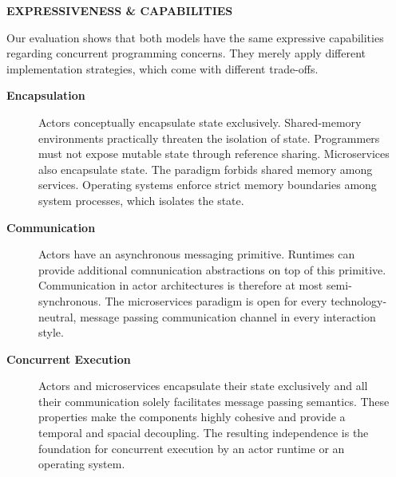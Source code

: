 \documentclass[final,hyperref={pdfpagelabels=true}]{beamer}
\begin{document}
\begin{frame}
  \begin{columns}[t]
    \begin{column}{.03\textwidth}
      \end{column}
    \begin{column}{.44\textwidth}
      \textsf{\textbf{EXPRESSIVENESS \& CAPABILITIES}} \\
      \vspace*{\baselineskip}
      {\lmodern
        \begin{justify}
        Our evaluation shows that both models have the same expressive capabilities regarding concurrent programming concerns. They merely apply different implementation strategies, which come with different trade-offs.
        \end{justify}
        
        \vspace*{\baselineskip}

        \begin{description}
          \item[\textbf{\textsf{Encapsulation}}] 
          \begin{justify}
          Actors conceptually encapsulate state exclusively. Shared-memory environments practically threaten the isolation of state. Programmers must not expose mutable state through reference sharing. Microservices also encapsulate state. The paradigm forbids shared memory among services. Operating systems enforce strict memory boundaries among system processes, which isolates the state.
          \end{justify}

          \vspace*{\baselineskip}

          \item[\textbf{\textsf{Communication}}] 
          \begin{justify}
          Actors have an asynchronous messaging primitive. Runtimes can provide additional comnunication abstractions on top of this primitive. Communication in actor architectures is therefore at most semi-synchronous. The microservices paradigm is open for every technology-neutral, message passing communication channel in every interaction style.
          \end{justify}

          \vspace*{\baselineskip}

          \item[\textbf{\textsf{Concurrent Execution}}] 
          \begin{justify}
          Actors and microservices encapsulate their state exclusively and all their communication solely facilitates message passing semantics. These properties make the components highly cohesive and provide a temporal and spacial decoupling. The resulting independence is the foundation for concurrent execution by an actor runtime or an operating system.
          \end{justify}


\end{description}}
\end{column}
\end{columns}
\end{frame}
\end{document}

